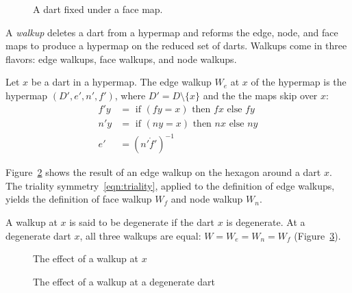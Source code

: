 \begin{figure}[htb]
  \centering
  \caption{A dart fixed under a face map.}
  \label{fig:dart-fix}
\end{figure}


A {\it walkup} deletes
a dart from a hypermap and reforms the edge, node, and face
maps to produce a hypermap on the reduced set of darts.  Walkups
come in three flavors: edge walkups, face walkups,
and node walkups.

\begin{definition}[walkup]
Let $x$ be a dart in a hypermap.  The edge walkup 
$W_e$ at $x$ of the hypermap is the hypermap
$(D',e',n',f')$, where $D' = D\setminus\{x\}$ and the
the maps skip over $x$:
    $$
    \begin{array}{lll}
    f' y &= \text{ if } (f y =  x) \text{ then } f x \text{ else
    } f y\\
    n' y &= \text{ if } (n y = x) \text{ then } n x \text{ else
    } n y\\
    e' &= (n'\ocirc f')^{-1}
    \end{array}
    $$
\end{definition}

Figure~\ref{fig:walk} shows
the result of an edge walkup on the hexagon around a dart $x$.
The triality symmetry~\ref{eqn:triality}, applied to the definition
of edge walkups, yields the definition of
face walkup $W_f$ and node walkup $W_n$.  

A walkup at $x$ is said to be degenerate if the dart $x$ is degenerate.   At a degenerate dart $x$, all three walkups are equal: $W=W_e=W_n=W_f$ (Figure~\ref{fig:walkdegen}).

\begin{figure}[htb]
  \centering
  \caption{The effect of a walkup at $x$}
  \label{fig:walk}
\end{figure}


\begin{figure}[htb]
  \centering
  \caption{The effect of a walkup at a degenerate dart}
  \label{fig:walkdegen}
\end{figure}


